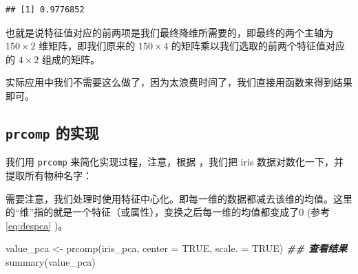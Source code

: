 \documentclass[
]{krantz}
\makeatletter
\newenvironment{Shaded}{\begin{snugshade}}{\end{snugshade}}
\newcommand{\AttributeTok}[1]{\textcolor[rgb]{0.77,0.63,0.00}{#1}}
\newcommand{\ConstantTok}[1]{\textcolor[rgb]{0.00,0.00,0.00}{#1}}
\newcommand{\DecValTok}[1]{\textcolor[rgb]{0.00,0.00,0.81}{#1}}
\newcommand{\DocumentationTok}[1]{\textcolor[rgb]{0.56,0.35,0.01}{\textbf{\textit{#1}}}}
\newcommand{\FunctionTok}[1]{\textcolor[rgb]{0.00,0.00,0.00}{#1}}
\newcommand{\NormalTok}[1]{#1}
\newcommand{\OtherTok}[1]{\textcolor[rgb]{0.56,0.35,0.01}{#1}}
\newcommand{\SpecialCharTok}[1]{\textcolor[rgb]{0.00,0.00,0.00}{#1}}
\newcommand{\StringTok}[1]{\textcolor[rgb]{0.31,0.60,0.02}{#1}}
\newenvironment{kframe}{%
\medskip{}
\setlength{\fboxsep}{.8em}
 \def\at@end@of@kframe{}%
 \ifinner\ifhmode%
  \def\at@end@of@kframe{\end{minipage}}%
  \begin{minipage}{\columnwidth}%
 \fi\fi%
 \def\FrameCommand##1{\hskip\@totalleftmargin \hskip-\fboxsep
 \colorbox{shadecolor}{##1}\hskip-\fboxsep
     \hskip-\linewidth \hskip-\@totalleftmargin \hskip\columnwidth}%
 \MakeFramed {\advance\hsize-\width
   \@totalleftmargin\z@ \linewidth\hsize
   \@setminipage}}%
 {\par\unskip\endMakeFramed%
 \at@end@of@kframe}
\renewenvironment{Shaded}{\begin{kframe}}{\end{kframe}}
\makeatother
\begin{document}
\begin{Shaded}
\end{Shaded}

\begin{verbatim}
## [1] 0.9776852
\end{verbatim}

也就是说特征值对应的前两项是我们最终降维所需要的，即最终的两个主轴为 \(150 \times 2\) 维矩阵，即我们原来的 \(150 \times 4\) 的矩阵乘以我们选取的前两个特征值对应的 \(4 \times 2\) 组成的矩阵。

实际应用中我们不需要这么做了，因为太浪费时间了，我们直接用函数来得到结果即可。

\hypertarget{prcom}{%
\subsection{\texorpdfstring{\texttt{prcomp} 的实现}{prcomp 的实现}}\label{prcom}}

我们用 \texttt{prcomp} 来简化实现过程，注意，根据 \citet{kemp2003modern}，我们把 iris 数据对数化一下，并提取所有物种名字：

\begin{Shaded}
\end{Shaded}

需要注意，我们处理时使用特征中心化。即每一维的数据都减去该维的均值。这里的``维''指的就是一个特征（或属性），变换之后每一维的均值都变成了0 (参考 \eqref{eq:despca} )。

\begin{Shaded}
\begin{Highlighting}[]
\NormalTok{value\_pca }\OtherTok{\textless{}{-}} \FunctionTok{prcomp}\NormalTok{(iris\_pca, }\AttributeTok{center =} \ConstantTok{TRUE}\NormalTok{, }\AttributeTok{scale. =} \ConstantTok{TRUE}\NormalTok{)}
\DocumentationTok{\#\# 查看结果}
\FunctionTok{summary}\NormalTok{(value\_pca)}
\end{Highlighting}
\end{Shaded}
\end{document}
